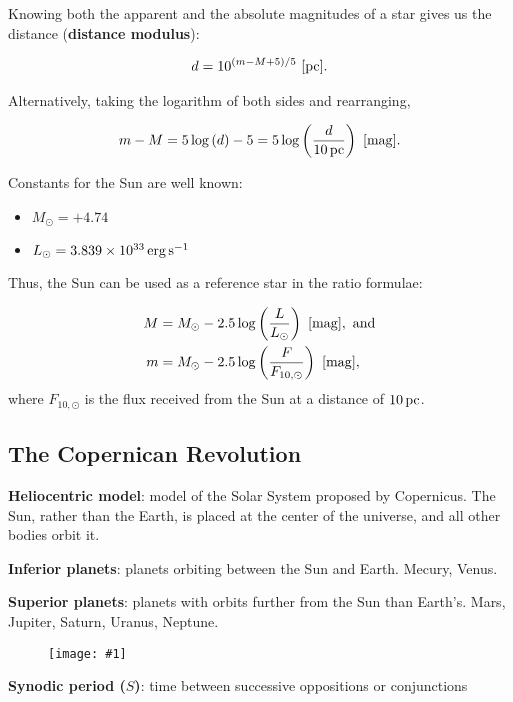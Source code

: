 \documentclass[a4paper,10pt]{article}
\newcommand{\fig}[1]{\centerline{\texttt{[image: \#1]}}}
\begin{document}
Knowing both the apparent and the absolute magnitudes of a star gives us the distance (\textbf{distance modulus}):

\begin{align*}
    d = 10^{(m-M+5)/5}~[{\rm pc}].
\end{align*}

Alternatively, taking the logarithm of both sides and rearranging, 

\begin{align*}
    m-M = 5\log\left(d\right)-5 = 5\log\left({\frac{d}{10\,{\rm pc}}}\right)~[{\rm mag}].
\end{align*}

Constants for the Sun are well known:

\begin{itemize}
    \item $M_\odot = +4.74$
    \item $L_\odot= 3.839\times 10^{33}\,{\rm erg\,s^{-1}}$
\end{itemize}

Thus, the Sun can be used as a reference star in the ratio formulae: 

\begin{align*}
    M &= M_\odot - 2.5\log\left(\frac{L}{L_\odot}\right)~[{\rm mag}],~{\rm and }\\
    m &= M_\odot - 2.5\log\left(\frac{F}{F_{10, \odot}}\right)~[{\rm mag}],
\end{align*}
where $F_{10, \odot}$ is the flux received from the Sun at a distance of $10\,{\rm pc}$.

\subsection{The Copernican Revolution}

\textbf{Heliocentric model}: model of the Solar System proposed by Copernicus. The Sun, rather than the Earth, is placed at the center of the universe, and all other bodies orbit it.

\textbf{Inferior planets}: planets orbiting between the Sun and Earth. Mecury, Venus.  

\textbf{Superior planets}: planets with orbits further from the Sun than Earth's. Mars, Jupiter, Saturn, Uranus, Neptune. 

\begin{figure}[h]
    \fig{orbital_configs}
\end{figure}

\textbf{Synodic period ($S$)}: time between successive oppositions or conjunctions 
\end{document}
